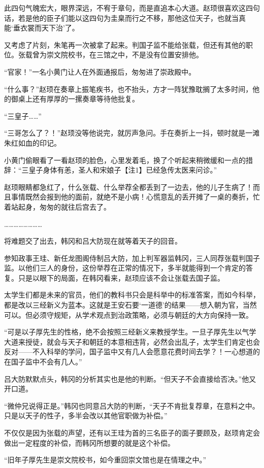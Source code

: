 此四句气魄宏大，眼界深远，不宥于章句，而是直追本心大道。赵顼很喜欢这四句话，若是他的臣子们能以这四句为圭臬而行之不移，那他这位天子，也就当真能‘垂衣裳而天下治’了。

又考虑了片刻，朱笔再一次被拿了起来。判国子监不能给张载，但还有其他的职位。张载曾为崇文院校书，在三馆之中，不是没有位置安排他。

“官家！”一名小黄门让人在外面通报后，匆匆进了崇政殿中。

“什么事？”赵顼在奏章上振笔疾书，也不抬头，方才一阵犹豫耽搁了太多时间，他的御桌上还有厚厚的一摞奏章等待他批复。

“三皇子……”

“三哥怎么了？！”赵顼没等他说完，就厉声急问。手在奏折上一抖，顿时就是一滩朱红如血的印记。

小黄门偷眼看了一看赵顼的脸色，心里发着毛，换了个听起来稍微缓和一点的措辞：“三皇子身体有恙，圣人和宋娘子【注1】已经急传太医来问诊。”

赵顼眼睛都急红了，什么张载、什么举荐全都丢到了一边去，他的儿子生病了！而且事情既然会报到他的面前，就绝不是小病！心慌意乱的丢开摊了一桌的奏折，忙着站起身，匆匆的就往后宫去了。

……………………

将难题交了出去，韩冈和吕大防现在就等着天子的回音。

参知政事王珪、新任龙图阁侍制吕大防，加上判军器监韩冈，三人同荐张载判国子监。以他们三人的身份，这份举荐在正常的情况下，多半就能得到一个肯定的答复。只是以眼下的局面，在韩冈看来，赵顼应该不会让张载去国子监。

太学生们都是未来的官员，他们的教科书只会是科举中的标准答案，而如今科举，都是改以三经新义为蓝本。这就是王安石要‘一道德’的结果——想入朝为官，当然可以。但必须守规矩，从学术观点到治政策略，必须与朝廷的大方向保持一致。

“可是以子厚先生的性格，绝不会按照三经新义来教授学生。一旦子厚先生以气学大道来授徒，就会与天子和朝廷的本意相违背，必然会出乱子，太学生们肯定也会反对——不入科举的学问，国子监中又有几人会愿意花费时间去学？！一心想道的在国子监中不会有几人。”

吕大防默默点头，韩冈的分析其实也是他的判断。“但天子不会直接给否决。”他又开口道。

“微仲兄说得正是。”韩冈也同意吕大防的判断，“天子不肯批复荐章，在意料之中。只是以天子的性子，多半会改以其他官职做为补偿。”

不仅仅是因为张载的声望，还有以王珪为首的三名臣子的面子要顾及，赵顼肯定会做出一定程度的补偿，而韩冈所想要的就是这个补偿。

“旧年子厚先生是崇文院校书，如今重回崇文馆也是在情理之中。”

